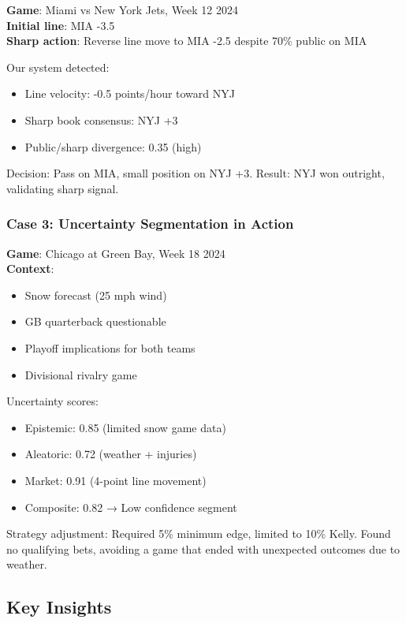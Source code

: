 \textbf{Game}: Miami vs New York Jets, Week 12 2024\\
\textbf{Initial line}: MIA -3.5\\
\textbf{Sharp action}: Reverse line move to MIA -2.5 despite 70\% public on MIA

Our system detected:
\begin{itemize}
  \item Line velocity: -0.5 points/hour toward NYJ
  \item Sharp book consensus: NYJ +3
  \item Public/sharp divergence: 0.35 (high)
\end{itemize}

Decision: Pass on MIA, small position on NYJ +3. Result: NYJ won outright, validating sharp signal.

\subsubsection{Case 3: Uncertainty Segmentation in Action}

\textbf{Game}: Chicago at Green Bay, Week 18 2024\\
\textbf{Context}:
\begin{itemize}
  \item Snow forecast (25 mph wind)
  \item GB quarterback questionable
  \item Playoff implications for both teams
  \item Divisional rivalry game
\end{itemize}

Uncertainty scores:
\begin{itemize}
  \item Epistemic: 0.85 (limited snow game data)
  \item Aleatoric: 0.72 (weather + injuries)
  \item Market: 0.91 (4-point line movement)
  \item Composite: 0.82 → Low confidence segment
\end{itemize}

Strategy adjustment: Required 5\% minimum edge, limited to 10\% Kelly. Found no qualifying bets, avoiding a game that ended with unexpected outcomes due to weather.

\subsection{Key Insights}

